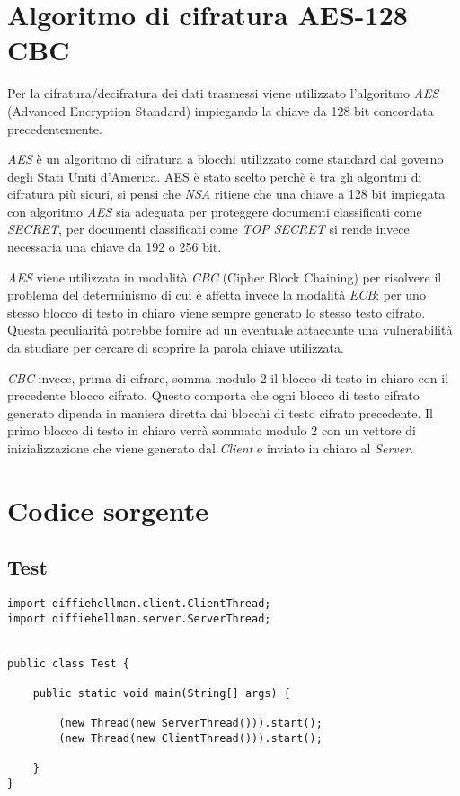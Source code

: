 \documentclass[12pt]{article}
\begin{document}
\section*{Algoritmo di cifratura AES-128 CBC}

Per la cifratura/decifratura dei dati trasmessi viene utilizzato l'algoritmo \textit{AES} (Advanced Encryption Standard) impiegando la chiave da 128 bit concordata precedentemente.
\par
\textit{AES} è un algoritmo di cifratura a blocchi utilizzato come standard dal governo degli Stati Uniti d'America.
AES è stato scelto perchè è tra gli algoritmi di cifratura più sicuri, si pensi che \textit{NSA} ritiene che una chiave a 128 bit impiegata con algoritmo \textit{AES} sia adeguata per proteggere documenti classificati come \textit{SECRET}, per documenti classificati come \textit{TOP SECRET} si rende invece necessaria una chiave da 192 o 256 bit.

\par
\textit{AES} viene utilizzata in modalità \textit{CBC} (Cipher Block Chaining) per risolvere il problema del determinismo di cui è affetta invece la modalità \textit{ECB}: per uno stesso blocco di testo in chiaro viene sempre generato lo stesso testo cifrato.
Questa peculiarità potrebbe fornire ad un eventuale attaccante una vulnerabilità da studiare per cercare di scoprire la parola chiave utilizzata.
\par
\textit{CBC} invece, prima di cifrare, somma modulo 2 il blocco di testo in chiaro con il precedente blocco cifrato. Questo comporta che ogni blocco di testo cifrato generato dipenda in maniera diretta dai blocchi di testo cifrato precedente.
Il primo blocco di testo in chiaro verrà sommato modulo 2 con un vettore di inizializzazione che viene generato dal \textit{Client} e inviato in chiaro al \textit{Server}.

\section*{Codice sorgente}

\subsection*{Test}
\begin{lstlisting}
import diffiehellman.client.ClientThread;
import diffiehellman.server.ServerThread;


public class Test {

	public static void main(String[] args) {

		(new Thread(new ServerThread())).start();
		(new Thread(new ClientThread())).start();

	}
}

\end{lstlisting}
\end{document}
